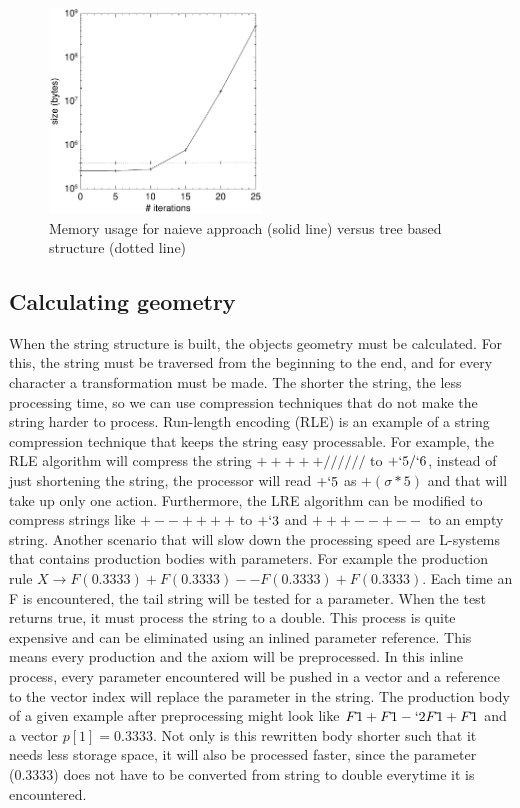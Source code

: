 \documentclass[11pt,a4paper]{article}
\begin{document}
\begin{figure}[h!]
  \centering
  \includegraphics[width=0.5\textwidth]{bench.pdf}
  \caption{Memory usage for naieve approach (solid line) versus tree based structure (dotted line)}
  \label{fig:bench}
\end{figure}

\subsection{Calculating geometry}

When the string structure is built, the objects geometry must be calculated. For this, the string must be traversed from the beginning to the end, and for every character a transformation must be made. The shorter the string, the less processing time, so we can use compression techniques that do not make the string harder to process. Run-length encoding (RLE) is an example of a string compression technique that keeps the string easy processable. For example, the RLE algorithm will compress the string $+++++//////$ to $+`5/`6$, instead of just shortening the string, the processor will read $+`5$ as $+(\sigma*5)$ and that will take up only one action. Furthermore, the LRE algorithm can be modified to compress strings like $+--++++$ to $+`3$ and $+++--+--$ to an empty string.
Another scenario that will slow down the processing speed are L-systems that contains production bodies with parameters. For example the production rule $X \rightarrow F(0.3333)+F(0.3333)--F(0.3333)+F(0.3333)$. Each time an F is encountered, the tail string will be tested for a parameter. When the test returns true, it must process the string to a double. This process is quite expensive and can be eliminated using an inlined parameter reference. This means every production and the axiom will be preprocessed. In this inline process, every parameter encountered will be pushed in a vector and a reference to the vector index will replace the parameter in the string. The production body of a given example after preprocessing might look like $F\tilde{ } 1+F\tilde{ } 1-`2F\tilde{ } 1+F\tilde{ } 1$ and a vector $p[1]=0.3333$. Not only is this rewritten body shorter such that it needs less storage space, it will also be processed faster, since the parameter (0.3333) does not have to be converted from string to double everytime it is encountered.
\end{document}
